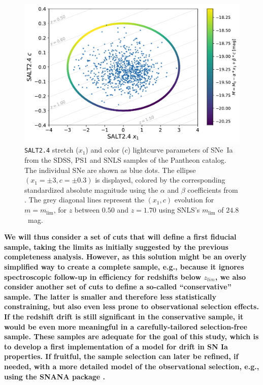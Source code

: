 \documentclass[referee]{aa}
\begin{document}
\begin{figure}
    \centering
    \includegraphics[width=0.95\linewidth]{Article_figures/zmax_maglim_snls.pdf}
    \caption{\textsc{\texttt{SALT2.4}} stretch ($x_1$) and color ($c$)
        lightcurve parameters of SNe~Ia from the SDSS, PS1 and SNLS samples of
        the Pantheon catalog. The individual SNe are shown as blue dots. The
        ellipse $(x_1=\pm3, c=\pm0.3)$ is displayed, colored by the
        corresponding standardized absolute magnitude using the $\alpha$ and
        $\beta$ coefficients from \cite{scolnic2018a}. The grey diagonal lines
        represent the $(x_1, c)$ evolution for $m = m_{\lim}$, for $z$ between
        $0.50$ and $z=1.70$ using SNLS's $m_{\lim}$ of $24.8$~mag.}
    \label{fig:maglim}
\end{figure}

\textbf{We will thus consider a set of cuts that will define a first fiducial
    sample, taking the limits as initially suggested by the previous
    completeness analysis. However, as this solution might be an overly
    simplified way to create a complete sample, e.g., because it ignores
    spectroscopic follow-up in efficiency for redshifts below $z_{lim}$, we
    also consider another set of cuts to define a so-called ``conservative''
    sample. The latter is smaller and therefore less statistically constraining,
    but also even less prone to observational selection effects. If the redshift
    drift is still significant in the conservative sample, it would be even more
    meaningful in a carefully-tailored selection-free sample. These samples are
    adequate for the goal of this study, which is to develop a first
    implementation of a model for drift in SN Ia properties. If fruitful, the
    sample selection can later be refined, if needed, with a more detailed model
of the observational selection, e.g., using the SNANA package \citep{SNANA}.}
\end{document}
